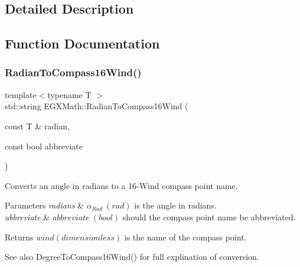 \subsection{Detailed Description}


\subsection{Function Documentation}
\mbox{\label{group___angle_conversions_gae3be24eac965abfab281c6307fed482a}} 
\subsubsection{\texorpdfstring{Radian\+To\+Compass16\+Wind()}{RadianToCompass16Wind()}}
{\footnotesize\ttfamily template$<$typename T $>$ \\
std\+::string E\+G\+X\+Math\+::\+Radian\+To\+Compass16\+Wind (\begin{DoxyParamCaption}\item[{const T \&}]{radian,  }\item[{const bool}]{abbreviate }\end{DoxyParamCaption})}



Converts an angle in radians to a 16-\/\+Wind compass point name. 


\begin{DoxyParams}{Parameters}
{\em radians} & $\alpha_{Rad}\ (rad)$ is the angle in radians. \\
\hline
{\em abbreviate} & $abbreviate\ (bool)$ should the compass point name be abbreviated. \\
\hline
\end{DoxyParams}
\begin{DoxyReturn}{Returns}
$wind (dimensionless)$ is the name of the compass point. 
\end{DoxyReturn}
\begin{DoxySeeAlso}{See also}
Degree\+To\+Compass16\+Wind() for full explination of conversion. 
\end{DoxySeeAlso}
\mbox{\label{group___angle_conversions_ga64587b5f303e1921ab34bc344b5089bb}} 

